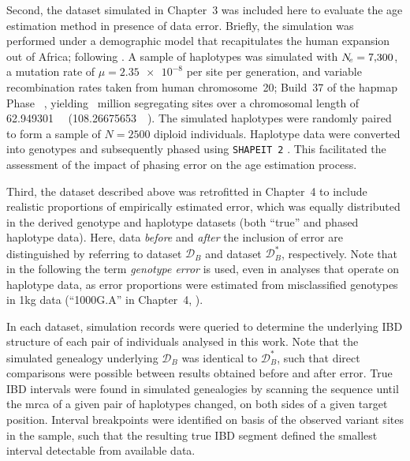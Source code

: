 Second, the dataset simulated in Chapter~3 was included here to evaluate the age estimation method in presence of data error.
Briefly, the simulation was performed under a demographic model that recapitulates the human expansion out of Africa; following \citet{Gutenkunst:2009gs}.
A sample of  haplotypes was simulated with ${N_{\!e}=\num{7300}}$, a mutation rate of ${\mu=\num[round-precision=2]{2.35e-8}}$ per site per generation, and variable recombination rates taken from human chromosome~20; Build~37 of the \gls{hapmap} Phase~ \citep{Frazer:2007kha, InternationalHapMapConsortium:2010en}, yielding ~million segregating sites over a chromosomal length of \SI{62.949301}{\mega\basepair} (\SI{108.26675653}{\centi\morgan}).
The simulated haplotypes were randomly paired to form a sample of ${N=\num{2500}}$ diploid individuals.
Haplotype data were converted into genotypes and subsequently phased using \texttt{SHAPEIT\,2} \citep{Delaneau:2008dk,Delaneau:2013hi}.
This facilitated the assessment of the impact of phasing error on the age estimation process.

Third, the dataset described above was retrofitted in Chapter~4 to include realistic proportions of empirically estimated error, which was equally distributed in the derived genotype and haplotype datasets (both ``true'' and phased haplotype data).
Here, data \emph{before} and \emph{after} the inclusion of error are distinguished by referring to dataset $\mathcal{D}_B$ and dataset $\mathcal{D}_B^{\ast}$, respectively.
Note that in the following the term \emph{genotype error} is used, even in analyses that operate on haplotype data, as error proportions were estimated from misclassified genotypes in \gls{1kg} data (``1000G.A'' in Chapter~4, ).


In each dataset, simulation records were queried to determine the underlying IBD structure of each pair of individuals analysed in this work.
Note that the simulated genealogy underlying $\mathcal{D}_B$ was identical to $\mathcal{D}_B^{\ast}$, such that direct comparisons were possible between results obtained before and after error.
True IBD intervals were found in simulated genealogies by scanning the sequence until the \gls{mrca} of a given pair of haplotypes changed, on both sides of a given target position.
Interval breakpoints were identified on basis of the observed variant sites in the sample, such that the resulting true IBD segment defined the smallest interval detectable from available data.




